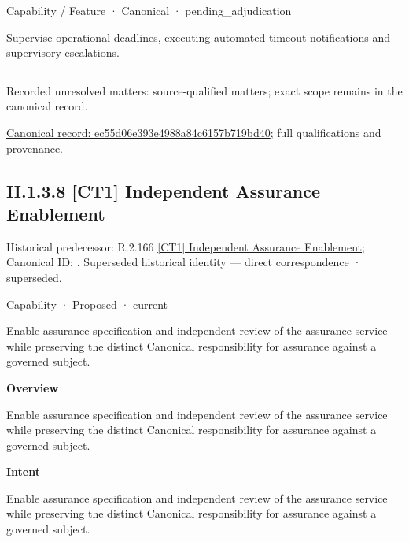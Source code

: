 \label{element:ec55d06e393e4988a84c6157b719bd40}
{\small Capability / Feature · Canonical · pending\_adjudication}\par

Supervise operational deadlines, executing automated timeout notifications and supervisory escalations.



\medskip\hrule\medskip

{\small Recorded unresolved matters: source-qualified matters; exact scope remains in the canonical record.}\par
{\footnotesize \href{../../../../../../../continuum/strategy/capability/feature/ec55d06e393e4988a84c6157b719bd40.md}{Canonical record: ec55d06e393e4988a84c6157b719bd40}; full qualifications and provenance.}\par
\subsection*{II.1.3.8 [CT1] Independent Assurance Enablement}
\label{navigation:II.1.3.8}

{\small Historical predecessor: R.2.166 \hyperref[element:88bf57b7a92c4c1da1b5f0a67d3ebd82]{[CT1] Independent Assurance Enablement}; Canonical ID: \texttt{}. Superseded historical identity — direct correspondence · superseded.}\par
\label{element:616682b612d244429e656b040e002d56}
{\small Capability · Proposed · current}\par

Enable assurance specification and independent review of the assurance service while preserving the distinct Canonical responsibility for assurance against a governed subject.



\textbf{Overview}



Enable assurance specification and independent review of the assurance service while preserving the distinct Canonical responsibility for assurance against a governed subject.



\textbf{Intent}



Enable assurance specification and independent review of the assurance service while preserving the distinct Canonical responsibility for assurance against a governed subject.



